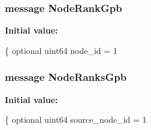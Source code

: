 \subsubsection[{Node\+Rank\+Gpb}]{\setlength{\rightskip}{0pt plus 5cm}message Node\+Rank\+Gpb}\label{ranking_8proto_ab1af16dd5bbf86f7aebf63324b196f08}
{\bfseries Initial value\+:}
\begin{DoxyCode}
\{
  optional uint64 node\_id = 1
\end{DoxyCode}
\hypertarget{ranking_8proto_adc2bbd7d7b97fce2a4134830bd20892f}{}
\subsubsection[{Node\+Ranks\+Gpb}]{\setlength{\rightskip}{0pt plus 5cm}message Node\+Ranks\+Gpb}\label{ranking_8proto_adc2bbd7d7b97fce2a4134830bd20892f}
{\bfseries Initial value\+:}
\begin{DoxyCode}
\{
  optional uint64 source\_node\_id = 1
\end{DoxyCode}
